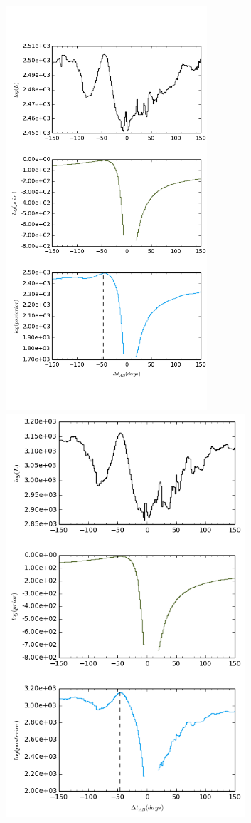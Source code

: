 \documentclass[\docopts]{\docclass}
\begin{document}
\begin{figure}[!h]
  \centering
  \begin{minipage}[bottom]{0.4\textwidth}
\includegraphics[width=\textwidth, height=15cm, keepaspectratio]{whiten1/data3_full_log.png}
  \end{minipage}
  \hfill
  \begin{minipage}[bottom]{0.4\textwidth}
\includegraphics[width=\textwidth, height=15cm, keepaspectratio]{whiten2/data3_full_log.png}

\end{minipage}
\end{figure}
\end{document}
